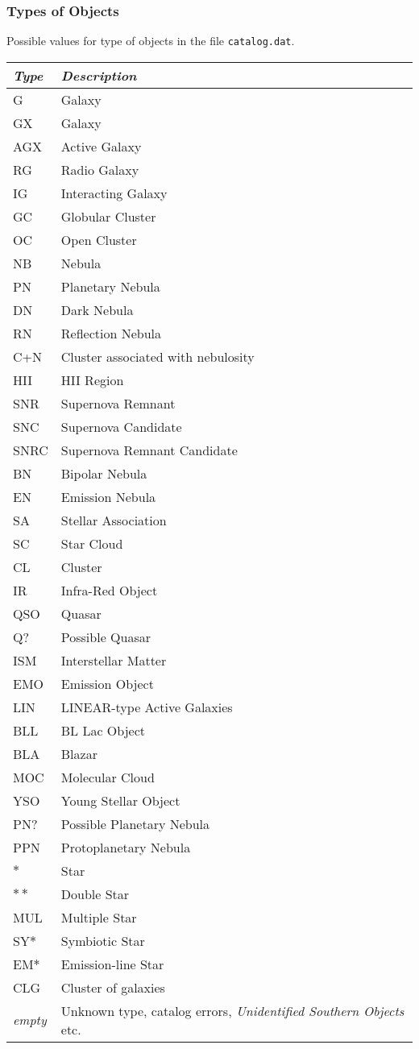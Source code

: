 \subsubsection{Types of Objects}
\label{sec:dso:types}

Possible values for type of objects in the file \texttt{catalog.dat}.

\begin{longtable}{l|p{120mm}}
\toprule
\emph{Type} & \emph{Description}\\\midrule
G   & Galaxy\\
GX  & Galaxy\\
AGX & Active Galaxy\\
RG  & Radio Galaxy\\
IG  & Interacting Galaxy\\
GC  & Globular Cluster\\
OC  & Open Cluster\\
NB  & Nebula\\
PN  & Planetary Nebula\\
DN  & Dark Nebula\\
RN  & Reflection Nebula\\
C+N & Cluster associated with nebulosity\\
HII & HII Region\\
SNR & Supernova Remnant\\
SNC & Supernova Candidate\\
SNRC & Supernova Remnant Candidate\\
BN  & Bipolar Nebula\\
EN  & Emission Nebula\\
SA  & Stellar Association\\
SC  & Star Cloud\\
CL  & Cluster\\
IR  & Infra-Red Object\\
QSO & Quasar\\
Q?  & Possible Quasar\\
ISM & Interstellar Matter\\
EMO & Emission Object\\
LIN & LINEAR-type Active Galaxies\\
BLL & BL Lac Object\\
BLA & Blazar\\
MOC & Molecular Cloud\\
YSO & Young Stellar Object\\
PN? & Possible Planetary Nebula\\
PPN & Protoplanetary Nebula\\
$\ast$ & Star\\
$\ast\ast$ & Double Star\\
MUL & Multiple Star\\
SY$\ast$ & Symbiotic Star\\
EM$\ast$ & Emission-line Star\\
CLG & Cluster of galaxies\\
\emph{empty} & Unknown type, catalog errors, \emph{Unidentified Southern Objects} etc.\\
\bottomrule
\end{longtable}


